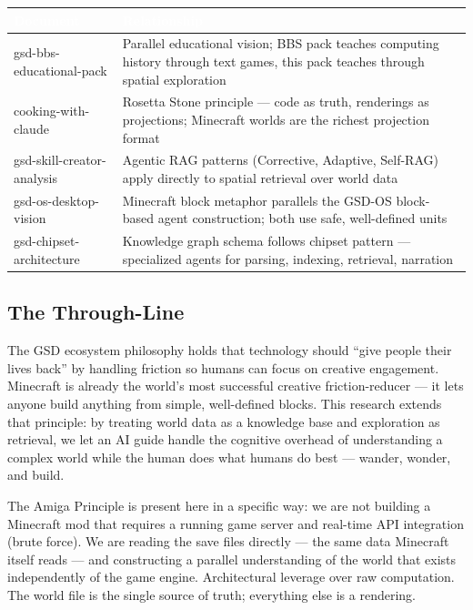 \documentclass[11pt,letterpaper]{article}
\newcommand{\tableheader}[1]{\textbf{\sffamily\textcolor{white}{#1}}}
\begin{document}
\begin{center}
\begin{tabularx}{\textwidth}{L{4cm}X}
\toprule
{}
\tableheader{Document} & \tableheader{Relationship} \\
\midrule
gsd-bbs-educational-pack & Parallel educational vision; BBS pack teaches computing history through text games, this pack teaches through spatial exploration \\
cooking-with-claude & Rosetta Stone principle --- code as truth, renderings as projections; Minecraft worlds are the richest projection format \\
gsd-skill-creator-analysis & Agentic RAG patterns (Corrective, Adaptive, Self-RAG) apply directly to spatial retrieval over world data \\
gsd-os-desktop-vision & Minecraft block metaphor parallels the GSD-OS block-based agent construction; both use safe, well-defined units \\
gsd-chipset-architecture & Knowledge graph schema follows chipset pattern --- specialized agents for parsing, indexing, retrieval, narration \\
\bottomrule
\end{tabularx}
\end{center}

\subsection{The Through-Line}

The GSD ecosystem philosophy holds that technology should ``give people their lives back'' by handling friction so humans can focus on creative engagement. Minecraft is already the world's most successful creative friction-reducer --- it lets anyone build anything from simple, well-defined blocks. This research extends that principle: by treating world data as a knowledge base and exploration as retrieval, we let an AI guide handle the cognitive overhead of understanding a complex world while the human does what humans do best --- wander, wonder, and build.

The Amiga Principle is present here in a specific way: we are not building a Minecraft mod that requires a running game server and real-time API integration (brute force). We are reading the save files directly --- the same data Minecraft itself reads --- and constructing a parallel understanding of the world that exists independently of the game engine. Architectural leverage over raw computation. The world file is the single source of truth; everything else is a rendering.
\end{document}
